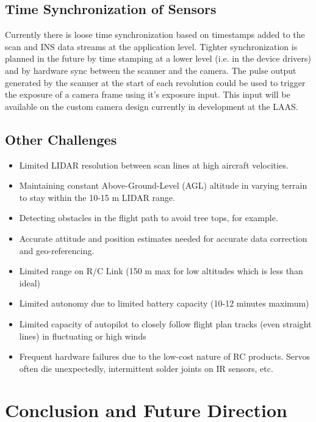 \documentclass[a4paper,11pt]{report}
\begin{document}
\section{Time Synchronization of Sensors}
 
Currently there is loose time synchronization based on timestamps added to the scan and INS data streams at the application level. Tighter synchronization is planned in the future by time stamping at a lower level (i.e. in the device drivers) and by hardware sync between the scanner and the camera. The pulse output generated by the scanner at the start of each revolution could be used to trigger the exposure of a camera frame using it's exposure input. This input will be available on the custom camera design currently in development at the LAAS.

\section{Other Challenges}

\begin{itemize}
 \item Limited LIDAR resolution between scan lines at high aircraft velocities.
 \item Maintaining constant Above-Ground-Level (AGL) altitude in varying terrain to stay within the 10-15 m LIDAR range.
 \item Detecting obstacles in the flight path to avoid tree tops, for example.
 \item Accurate attitude and position estimates needed for accurate data correction and geo-referencing.
 \item Limited range on R/C Link (150 m max for low altitudes which is less than ideal)
 \item Limited autonomy due to limited battery capacity (10-12 minutes maximum)
 \item Limited capacity of autopilot to closely follow flight plan tracks (even straight lines) in fluctuating or high winds
 \item Frequent hardware failures due to the low-cost nature of RC products. Servos often die unexpectedly, intermittent solder joints on IR sensors, etc.
\end{itemize}

\chapter{Conclusion and Future Direction}
\end{document}
